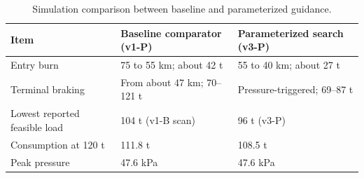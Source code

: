 \begin{table}[htbp]
\caption{Simulation comparison between baseline and parameterized guidance.}
\label{tab:src15}
\small
\setlength{\tabcolsep}{3.5pt}
\begin{tabularx}{\linewidth}{@{}p{.34\linewidth}XX@{}}
\toprule
Item & Baseline comparator (v1-P) & Parameterized search (v3-P) \\
\midrule
Entry burn & 75 to 55 km; about 42 t & 55 to 40 km; about 27 t \\
Terminal braking & From about 47 km; 70--121 t & Pressure-triggered; 69--87 t \\
Lowest reported feasible load & 104 t (v1-B scan) & 96 t (v3-P) \\
Consumption at 120 t & 111.8 t & 108.5 t \\
Peak pressure & 47.6 kPa & 47.6 kPa \\
\bottomrule
\end{tabularx}
\par{}
\end{table}
